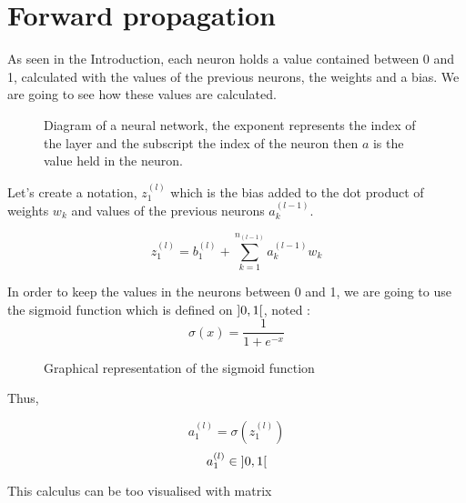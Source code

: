 \documentclass[]{report}
\begin{document}
\section{Forward propagation}

{As seen in the Introduction, each neuron holds a value contained between 0 and 1, calculated with the values of the previous neurons, the weights and a bias. We are going to see how these values are calculated.}

\begin{figure}[H]
    \centering
    \begin{neuralnetwork}[height=4, nodespacing=15mm]
        \newcommand{\inputtext}[2]{$a^{(l-1)}_#2$}
        \newcommand{\outputtext}[2]{$a^{(l)}_#2$}
        \inputlayer[count=3, bias=false, text=\inputtext, title=Input layer]
        \outputlayer[count=1,  text=\outputtext, title=Output layer]
        \linklayers[title=Weights $w_k$]
    \end{neuralnetwork}
    \caption{Diagram of a neural network, the exponent represents the index of the layer and the subscript the index of the neuron then $a$ is the value held in the neuron.}
\end{figure}

{Let's create a notation, $z^{(l)}_1$ which is the bias added to the dot product of weights $w_k$ and values of the previous neurons $a^{(l-1)}_k$.}

\[{z^{(l)}_1=b^{(l)}_1+\sum_{k=1}^{n_{(l-1)}} a^{(l-1)}_k w_k}\]

{In order to keep the values in the neurons between 0 and 1, we are going to use the sigmoid function which is defined on $\interval[open]{0}{1}$, noted :}
\[\sigma(x)=\frac{1}{1+e^{-x}}\]

\begin{figure}[H]
    \centering
    \caption{Graphical representation of the sigmoid function}
\end{figure}

{Thus,}

\[a^{(l)}_1=\sigma\left(z^{(l)}_1\right)\]
\[a^{(l)}_1 \in \interval[open]{0}{1}\]

{This calculus can be too visualised with matrix}
\end{document}
